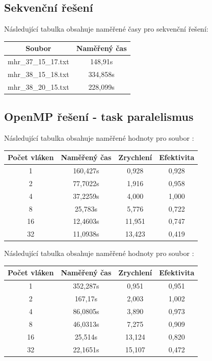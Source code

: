 \documentclass{article}
\begin{document}
\subsection{Sekvenční řešení}
Následující tabulka obsahuje naměřené časy pro sekvenční řešení:
\begin{table}[H]\centering
    \begin{tabular}{|c|c|}
        \hline \textbf{Soubor} & \textbf{Naměřený čas} \\ \hline \hline
        mhr\_37\_15\_17.txt & 148,91s \\  \hline
        mhr\_38\_15\_18.txt & 334,858s \\  \hline
        mhr\_38\_20\_15.txt & 228,099s \\  \hline
    \end{tabular}
\end{table} 

\subsection{OpenMP řešení - task paralelismus}
Následující tabulka obsahuje naměřené hodnoty pro soubor :
\begin{table}[H]\centering
    \begin{tabular}{|c|c|c|c|}
        \hline \textbf{Počet vláken} & \textbf{Naměřený čas} & \textbf{Zrychlení} & \textbf{Efektivita} \\ \hline \hline
        1 &	160,427s & 0,928 & 0,928 \\ \hline
        2 &	77,7022s & 1,916 & 0,958 \\ \hline
        4 &	37,2259s & 4,000 & 1,000 \\ \hline
        8 &	25,783s & 5,776 & 0,722 \\ \hline
        16 & 12,4603s & 11,951 & 0,747 \\ \hline
        32 & 11,0938s & 13,423 & 0,419 \\ \hline
    \end{tabular}
\end{table} 
\noindent Následující tabulka obsahuje naměřené hodnoty pro soubor :
\begin{table}[H]\centering
    \begin{tabular}{|c|c|c|c|}
        \hline \textbf{Počet vláken} & \textbf{Naměřený čas} & \textbf{Zrychlení} & \textbf{Efektivita} \\ \hline \hline
        1 & 352,287s & 0,951 & 0,951 \\  \hline
        2 & 167,17s & 2,003 & 1,002 \\  \hline
        4 & 86,0805s & 3,890 & 0,973 \\  \hline
        8 & 46,0313s & 7,275 & 0,909 \\  \hline 
        16 & 25,514s & 13,124 & 0,820 \\  \hline
        32 & 22,1651s & 15,107 & 0,472 \\  \hline
    \end{tabular}
\end{table} 
\end{document}
